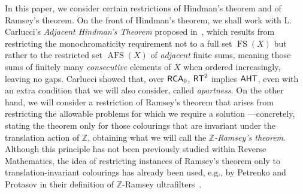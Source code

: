 \documentclass[11pt]{amsart}
\newcommand{\rt}{\mathnormal{\mathsf{RT}}}
\newcommand{\aht}{\mathnormal{\mathsf{AHT}}}
\newcommand{\rca}{\mathnormal{\mathsf{RCA}}_0}
\DeclareMathOperator{\afs}{AFS}
\DeclareMathOperator{\fs}{FS}
\theoremstyle{definition}
\begin{document}
In this paper, we consider certain restrictions of Hindman's theorem and of Ramsey's theorem. On the front of Hindman's theorem, we shall work with L. Carlucci's {\it Adjacent Hindman's Theorem} proposed in~\cite{carlucci-adjacent}, which results from restricting the monochromaticity requirement not to a full set $\fs(X)$ but rather to the restricted set $\afs(X)$ of {\it adjacent} finite sums, meaning those sums of finitely many {\it consecutive} elements of $X$ when ordered increasingly, leaving no gaps. Carlucci showed that, over $\rca$, $\rt^2$ implies $\aht$, even with an extra condition that we will also consider, called {\it apartness}. On the other hand, we will consider a restriction of Ramsey's theorem that arises from restricting the allowable problems for which we require a solution ---concretely, stating the theorem only for those colourings that are invariant under the translation action of $\mathbb Z$, obtaining what we will call the {\it $\mathbb Z$-Ramsey's theorem}. Although this principle has not been previously studied within Reverse Mathematics, the idea of restricting instances of Ramsey's theorem only to translation-invariant colourings has already been used, e.g., by Petrenko and Protasov in their definition of $\mathbb Z$-Ramsey ultrafilters~\cite{petrenko-protasov}.
\end{document}
